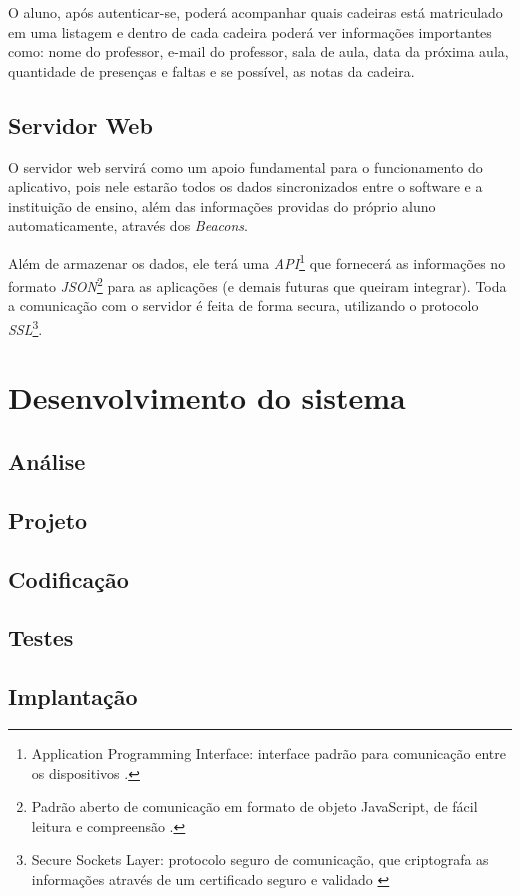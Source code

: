 \documentclass[
	12pt,
	oneside,
	a4paper,
	english,
	brazil,
]{abntex2}
\begin{document}
O aluno, após autenticar-se, poderá acompanhar quais cadeiras está matriculado em uma listagem e dentro de cada cadeira poderá ver informações importantes como: nome do professor, e-mail do professor, sala de aula, data da próxima aula, quantidade de presenças e faltas e se possível, as notas da cadeira.

\subsection{Servidor Web}

O servidor web servirá como um apoio fundamental para o funcionamento do aplicativo, pois nele estarão todos os dados sincronizados entre o software e a instituição de ensino, além das informações providas do próprio aluno automaticamente, através dos \emph{Beacons}.

Além de armazenar os dados, ele terá uma \emph{API}\footnote{Application Programming Interface: interface padrão para comunicação entre os dispositivos \cite{footnote-api}.} que fornecerá as informações no formato \emph{JSON}\footnote{Padrão aberto de comunicação em formato de objeto JavaScript, de fácil leitura e compreensão \cite{footnote-json}.} para as aplicações (e demais futuras que queiram integrar). Toda a comunicação com o servidor é feita de forma secura, utilizando o protocolo \emph{SSL}\footnote{Secure Sockets Layer: protocolo seguro de comunicação, que criptografa as informações através de um certificado seguro e validado \cite{footnote-ssl}}. 

\section{Desenvolvimento do sistema}
\subsection{Análise}
\subsection{Projeto}
\subsection{Codificação}
\subsection{Testes}
\subsection{Implantação}
\end{document}
